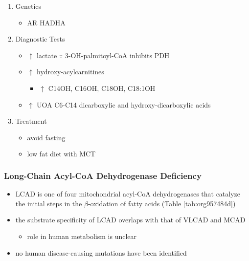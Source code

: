\documentclass[12pt]{scrartcl}
\begin{document}
\begin{enumerate}
\item Genetics
\label{sec:org09dc790}
\begin{itemize}
\item AR HADHA
\end{itemize}

\item Diagnostic Tests
\label{sec:orgaebc207}
\begin{itemize}
\item \(\uparrow\) lactate \(\because\) 3-OH-palmitoyl-CoA inhibits PDH
\item \(\uparrow\) hydroxy-acylcarnitines
\begin{itemize}
\item \(\uparrow\) C14OH, C16OH, C18OH, C18:1OH
\end{itemize}
\item \(\uparrow\) UOA C6-C14 dicarboxylic and hydroxy-dicarboxylic acids
\end{itemize}

\item Treatment
\label{sec:org6172ce4}
\begin{itemize}
\item avoid fasting
\item low fat diet with MCT
\end{itemize}
\end{enumerate}
\subsubsection{Long-Chain Acyl-CoA Dehydrogenase Deficiency}
\label{sec:org9744f4f}
\begin{itemize}
\item LCAD is one of four mitochondrial acyl-CoA dehydrogenases that
catalyze the initial steps in the \(\beta\)-oxidation of fatty acids
(Table \ref{tab:org957484d})
\item the substrate specificity of LCAD overlaps with that of
VLCAD and MCAD
\begin{itemize}
\item role  in  human  metabolism  is unclear
\end{itemize}
\item no human disease-causing mutations have been identified
\end{itemize}
\end{document}
